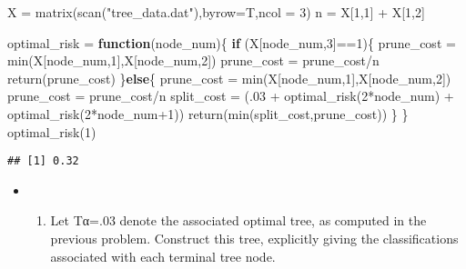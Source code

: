 \documentclass[
]{article}
\newenvironment{Shaded}{\begin{snugshade}}{\end{snugshade}}
\newcommand{\AttributeTok}[1]{\textcolor[rgb]{0.77,0.63,0.00}{#1}}
\newcommand{\ControlFlowTok}[1]{\textcolor[rgb]{0.13,0.29,0.53}{\textbf{#1}}}
\newcommand{\DecValTok}[1]{\textcolor[rgb]{0.00,0.00,0.81}{#1}}
\newcommand{\FunctionTok}[1]{\textcolor[rgb]{0.00,0.00,0.00}{#1}}
\newcommand{\NormalTok}[1]{#1}
\newcommand{\OtherTok}[1]{\textcolor[rgb]{0.56,0.35,0.01}{#1}}
\newcommand{\SpecialCharTok}[1]{\textcolor[rgb]{0.00,0.00,0.00}{#1}}
\newcommand{\StringTok}[1]{\textcolor[rgb]{0.31,0.60,0.02}{#1}}
\providecommand{\tightlist}{%
  \setlength{\itemsep}{0pt}\setlength{\parskip}{0pt}}
\begin{document}
\begin{Shaded}
\begin{Highlighting}[]
\NormalTok{X }\OtherTok{=} \FunctionTok{matrix}\NormalTok{(}\FunctionTok{scan}\NormalTok{(}\StringTok{"tree\_data.dat"}\NormalTok{),}\AttributeTok{byrow=}\NormalTok{T,}\AttributeTok{ncol =} \DecValTok{3}\NormalTok{)}
\NormalTok{n }\OtherTok{=}\NormalTok{ X[}\DecValTok{1}\NormalTok{,}\DecValTok{1}\NormalTok{] }\SpecialCharTok{+}\NormalTok{ X[}\DecValTok{1}\NormalTok{,}\DecValTok{2}\NormalTok{]}

\NormalTok{optimal\_risk }\OtherTok{=} \ControlFlowTok{function}\NormalTok{(node\_num)\{}
  \ControlFlowTok{if}\NormalTok{ (X[node\_num,}\DecValTok{3}\NormalTok{]}\SpecialCharTok{==}\DecValTok{1}\NormalTok{)\{}
\NormalTok{    prune\_cost }\OtherTok{=} \FunctionTok{min}\NormalTok{(X[node\_num,}\DecValTok{1}\NormalTok{],X[node\_num,}\DecValTok{2}\NormalTok{])}
\NormalTok{    prune\_cost }\OtherTok{=}\NormalTok{ prune\_cost}\SpecialCharTok{/}\NormalTok{n}
    \FunctionTok{return}\NormalTok{(prune\_cost)}
\NormalTok{    \}}\ControlFlowTok{else}\NormalTok{\{}
\NormalTok{      prune\_cost }\OtherTok{=} \FunctionTok{min}\NormalTok{(X[node\_num,}\DecValTok{1}\NormalTok{],X[node\_num,}\DecValTok{2}\NormalTok{])}
\NormalTok{      prune\_cost }\OtherTok{=}\NormalTok{ prune\_cost}\SpecialCharTok{/}\NormalTok{n}
\NormalTok{      split\_cost }\OtherTok{=}\NormalTok{ (.}\DecValTok{03} \SpecialCharTok{+} \FunctionTok{optimal\_risk}\NormalTok{(}\DecValTok{2}\SpecialCharTok{*}\NormalTok{node\_num) }\SpecialCharTok{+} \FunctionTok{optimal\_risk}\NormalTok{(}\DecValTok{2}\SpecialCharTok{*}\NormalTok{node\_num}\SpecialCharTok{+}\DecValTok{1}\NormalTok{))}
      \FunctionTok{return}\NormalTok{(}\FunctionTok{min}\NormalTok{(split\_cost,prune\_cost))}
\NormalTok{    \}}
\NormalTok{\}}
\FunctionTok{optimal\_risk}\NormalTok{(}\DecValTok{1}\NormalTok{)}
\end{Highlighting}
\end{Shaded}

\begin{verbatim}
## [1] 0.32
\end{verbatim}

\begin{itemize}
\item
  \begin{enumerate}
  \def\labelenumi{\alph{enumi})}
  \setcounter{enumi}{1}
  \tightlist
  \item
    Let Tα=.03 denote the associated optimal tree, as computed in the
    previous problem. Construct this tree, explicitly giving the
    classifications associated with each terminal tree node.
  \end{enumerate}
\end{itemize}
\end{document}
